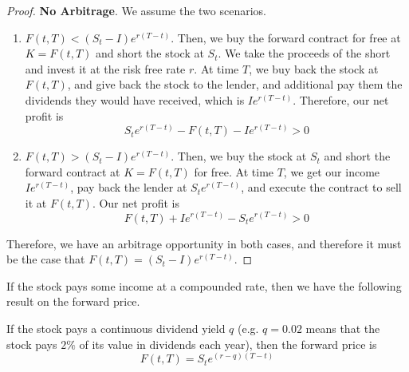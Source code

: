 \documentclass{article}
\begin{document}
    \begin{proof}
      \textbf{No Arbitrage}. We assume the two scenarios. 
      \begin{enumerate}
        \item $F(t, T) < (S_t - I) e^{r(T - t)}$. Then, we buy the forward contract for free at $K = F(t, T)$ and short the stock at $S_t$. We take the proceeds of the short and invest it at the risk free rate $r$. At time $T$, we buy back the stock at $F(t, T)$, and give back the stock to the lender, and additional pay them the dividends they would have received, which is $I e^{r(T - t)}$. Therefore, our net profit is
          \begin{equation}
            S_t e^{r(T - t)} - F(t, T) - I e^{r(T - t)} > 0
          \end{equation}
        \item $F(t, T) > (S_t - I) e^{r(T - t)}$. Then, we buy the stock at $S_t$ and short the forward contract at $K = F(t, T)$ for free. At time $T$, we get our income $I e^{r(T - t)}$, pay back the lender at $S_t e^{r(T - t)}$, and execute the contract to sell it at $F(t, T)$. Our net profit is 
          \begin{equation}
            F(t, T) + I e^{r(T - t)} - S_t e^{r(T - t)} > 0
          \end{equation}
      \end{enumerate}
      Therefore, we have an arbitrage opportunity in both cases, and therefore it must be the case that $F(t, T) = (S_t - I) e^{r(T - t)}$.
    \end{proof}

    If the stock pays some income at a compounded rate, then we have the following result on the forward price. 

    \begin{theorem}
      \label{thm:forward-price-of-compounded-income-asset}
      If the stock pays a continuous dividend yield $q$ (e.g. $q = 0.02$ means that the stock pays $2\%$ of its value in dividends each year), then the forward price is 
      \begin{equation}
        F(t, T) = S_t e^{(r - q)(T - t)}
      \end{equation}
    \end{theorem}
\end{document}
